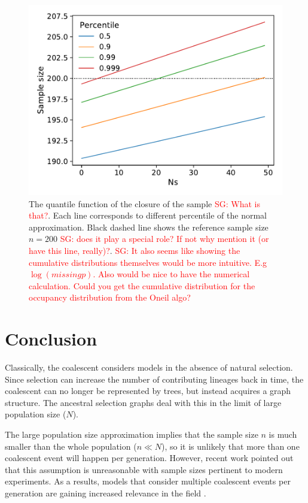 \documentclass[review]{elsarticle}
\newcommand{\sgcomment}[1]{\textcolor{red}{SG: #1}}
\begin{document}
\begin{figure}
  \centering
  \includegraphics[]{fig/quantile.pdf}
   \caption{The quantile function of the closure of the sample \sgcomment{What is that?}. Each line corresponds to different
     percentile of the normal approximation. Black dashed line shows the reference sample size $n=200$ \sgcomment{does it play a special role? If not why mention it (or have this line, really)?}. \sgcomment{It also seems like showing the cumulative distributions themselves would be more intuitive. E.g $\log(missing p)$. Also would be nice to have the numerical calculation. Could you get the cumulative distribution for the occupancy distribution from the Oneil algo? }}
  \label{fig:normal-approximation}
\end{figure}


\section{Conclusion}
\label{sec:conclusion}

Classically, the coalescent considers models in the absence of natural selection. Since selection
can increase the number of contributing lineages back in time, the coalescent can no longer be
represented by trees, but instead acquires a graph structure. The ancestral selection graphs
\citep{KroneNeuhauser1997} deal with this in the limit of large population size ($N$).

The large population size approximation implies that the sample size $n$ is much smaller than the
whole population ($n \ll N$), so it is unlikely that more than one coalescent event will happen per
generation. However, recent work \citep{BhaskarEtAl2014,NelsonEtAl2019} pointed out that this
assumption is unreasonable with sample sizes pertinent to modern experiments. As a results, models
that consider multiple coalescent events per generation are gaining increased relevance in the
field \citep{FlemmingtonVoitCoalescentPapers}.
\end{document}
